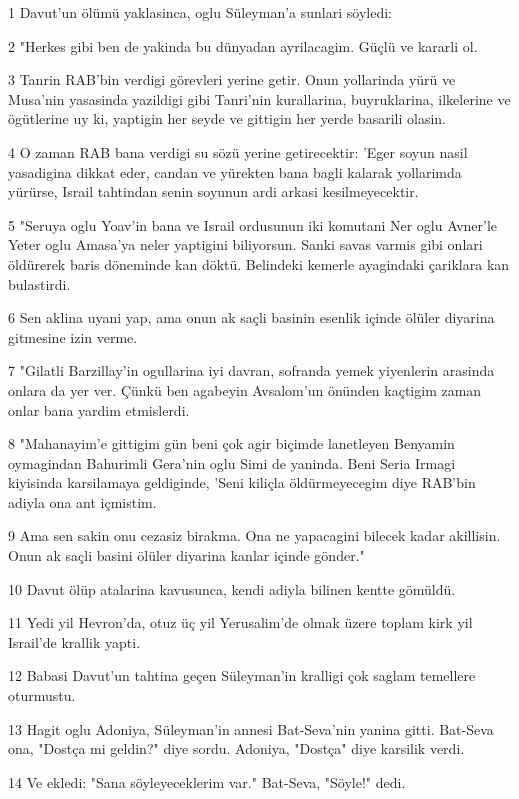 \par 1 Davut'un ölümü yaklasinca, oglu Süleyman'a sunlari söyledi:
\par 2 "Herkes gibi ben de yakinda bu dünyadan ayrilacagim. Güçlü ve kararli ol.
\par 3 Tanrin RAB'bin verdigi görevleri yerine getir. Onun yollarinda yürü ve Musa'nin yasasinda yazildigi gibi Tanri'nin kurallarina, buyruklarina, ilkelerine ve ögütlerine uy ki, yaptigin her seyde ve gittigin her yerde basarili olasin.
\par 4 O zaman RAB bana verdigi su sözü yerine getirecektir: 'Eger soyun nasil yasadigina dikkat eder, candan ve yürekten bana bagli kalarak yollarimda yürürse, Israil tahtindan senin soyunun ardi arkasi kesilmeyecektir.
\par 5 "Seruya oglu Yoav'in bana ve Israil ordusunun iki komutani Ner oglu Avner'le Yeter oglu Amasa'ya neler yaptigini biliyorsun. Sanki savas varmis gibi onlari öldürerek baris döneminde kan döktü. Belindeki kemerle ayagindaki çariklara kan bulastirdi.
\par 6 Sen aklina uyani yap, ama onun ak saçli basinin esenlik içinde ölüler diyarina gitmesine izin verme.
\par 7 "Gilatli Barzillay'in ogullarina iyi davran, sofranda yemek yiyenlerin arasinda onlara da yer ver. Çünkü ben agabeyin Avsalom'un önünden kaçtigim zaman onlar bana yardim etmislerdi.
\par 8 "Mahanayim'e gittigim gün beni çok agir biçimde lanetleyen Benyamin oymagindan Bahurimli Gera'nin oglu Simi de yaninda. Beni Seria Irmagi kiyisinda karsilamaya geldiginde, 'Seni kiliçla öldürmeyecegim diye RAB'bin adiyla ona ant içmistim.
\par 9 Ama sen sakin onu cezasiz birakma. Ona ne yapacagini bilecek kadar akillisin. Onun ak saçli basini ölüler diyarina kanlar içinde gönder."
\par 10 Davut ölüp atalarina kavusunca, kendi adiyla bilinen kentte gömüldü.
\par 11 Yedi yil Hevron'da, otuz üç yil Yerusalim'de olmak üzere toplam kirk yil Israil'de krallik yapti.
\par 12 Babasi Davut'un tahtina geçen Süleyman'in kralligi çok saglam temellere oturmustu.
\par 13 Hagit oglu Adoniya, Süleyman'in annesi Bat-Seva'nin yanina gitti. Bat-Seva ona, "Dostça mi geldin?" diye sordu. Adoniya, "Dostça" diye karsilik verdi.
\par 14 Ve ekledi: "Sana söyleyeceklerim var." Bat-Seva, "Söyle!" dedi.
